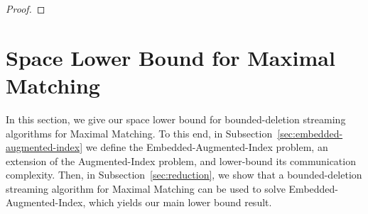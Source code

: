 \documentclass[11pt,a4paper]{article}
\begin{document}
\begin{proof}
    
\end{proof}



\section{Space Lower Bound for \textsf{Maximal Matching}} \label{sec:lb}
In this section, we give our space lower bound for bounded-deletion streaming algorithms for \textsf{Maximal Matching}. To this end, in Subsection~\ref{sec:embedded-augmented-index} we define the \textsf{Embedded-Augmented-Index} problem, an extension of the \textsf{Augmented-Index} problem, and lower-bound its  communication complexity. Then, in Subsection~\ref{sec:reduction}, we show that a bounded-deletion streaming algorithm for \textsf{Maximal Matching} can be used to solve \textsf{Embedded-Augmented-Index}, which yields our main lower bound result.
\end{document}
